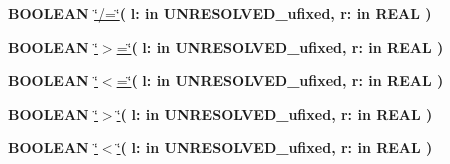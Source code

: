 \begin{DoxyCompactItemize}
\item 
{\bfseries {\bfseries \textcolor{comment}{B\+O\+O\+L\+E\+A\+N}\textcolor{vhdlchar}{ }}} \hyperlink{classfixed__pkg_a00087aded97b434060226b9ba63a9077}{\char`\"{}/=\char`\"{}}{\bfseries  ( }{\bfseries \textcolor{vhdlchar}{l\+: }\textcolor{stringliteral}{in }\textcolor{vhdlchar}{U\+N\+R\+E\+S\+O\+L\+V\+E\+D\+\_\+ufixed}}{\bfseries  , \textcolor{vhdlchar}{r\+: }\textcolor{stringliteral}{in }{\bfseries \textcolor{comment}{R\+E\+A\+L}\textcolor{vhdlchar}{ }}}{\bfseries  )} 
\item 
{\bfseries {\bfseries \textcolor{comment}{B\+O\+O\+L\+E\+A\+N}\textcolor{vhdlchar}{ }}} \hyperlink{classfixed__pkg_a4cd07e388cdbb3996dd11f56781d3758}{\char`\"{}$>$=\char`\"{}}{\bfseries  ( }{\bfseries \textcolor{vhdlchar}{l\+: }\textcolor{stringliteral}{in }\textcolor{vhdlchar}{U\+N\+R\+E\+S\+O\+L\+V\+E\+D\+\_\+ufixed}}{\bfseries  , \textcolor{vhdlchar}{r\+: }\textcolor{stringliteral}{in }{\bfseries \textcolor{comment}{R\+E\+A\+L}\textcolor{vhdlchar}{ }}}{\bfseries  )} 
\item 
{\bfseries {\bfseries \textcolor{comment}{B\+O\+O\+L\+E\+A\+N}\textcolor{vhdlchar}{ }}} \hyperlink{classfixed__pkg_a65b73a94d4fe541a941f431175b342b7}{\char`\"{}$<$=\char`\"{}}{\bfseries  ( }{\bfseries \textcolor{vhdlchar}{l\+: }\textcolor{stringliteral}{in }\textcolor{vhdlchar}{U\+N\+R\+E\+S\+O\+L\+V\+E\+D\+\_\+ufixed}}{\bfseries  , \textcolor{vhdlchar}{r\+: }\textcolor{stringliteral}{in }{\bfseries \textcolor{comment}{R\+E\+A\+L}\textcolor{vhdlchar}{ }}}{\bfseries  )} 
\item 
{\bfseries {\bfseries \textcolor{comment}{B\+O\+O\+L\+E\+A\+N}\textcolor{vhdlchar}{ }}} \hyperlink{classfixed__pkg_ac6c82329bf849852be997a3d0a737cf9}{\char`\"{}$>$\char`\"{}}{\bfseries  ( }{\bfseries \textcolor{vhdlchar}{l\+: }\textcolor{stringliteral}{in }\textcolor{vhdlchar}{U\+N\+R\+E\+S\+O\+L\+V\+E\+D\+\_\+ufixed}}{\bfseries  , \textcolor{vhdlchar}{r\+: }\textcolor{stringliteral}{in }{\bfseries \textcolor{comment}{R\+E\+A\+L}\textcolor{vhdlchar}{ }}}{\bfseries  )} 
\item 
{\bfseries {\bfseries \textcolor{comment}{B\+O\+O\+L\+E\+A\+N}\textcolor{vhdlchar}{ }}} \hyperlink{classfixed__pkg_a5d059cf3277e3585e4f3f076db10b273}{\char`\"{}$<$\char`\"{}}{\bfseries  ( }{\bfseries \textcolor{vhdlchar}{l\+: }\textcolor{stringliteral}{in }\textcolor{vhdlchar}{U\+N\+R\+E\+S\+O\+L\+V\+E\+D\+\_\+ufixed}}{\bfseries  , \textcolor{vhdlchar}{r\+: }\textcolor{stringliteral}{in }{\bfseries \textcolor{comment}{R\+E\+A\+L}\textcolor{vhdlchar}{ }}}{\bfseries  )} 

\end{DoxyCompactItemize}
